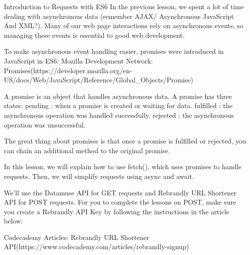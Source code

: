 Introduction to Requests with ES6
    In the previous lesson, we spent a lot of time dealing with asynchronous data (remember AJAX/ Asynchronous JavaScript And XML?). Many of our web page interactions rely on asynchronous events, so managing these events is essential to good web development.

    To make asynchronous event handling easier, promises were introduced in JavaScript in ES6:
        Mozilla Development Network: Promises(https://developer.mozilla.org/en-US/docs/Web/JavaScript/Reference/Global_Objects/Promise)
    
    A promise is an object that handles asynchronous data. A promise has three states:
        pending : when a promise is created or waiting for data.
        fulfilled : the asynchronous operation was handled successfully.
        rejected : the asynchronous operation was unsuccessful.
    
    The great thing about promises is that once a promise is fulfilled or rejected, you can chain an additional method to the original promise.

    In this lesson, we will explain how to use fetch(), which uses promises to handle requests. Then, we will simplify requests using async and await.

    We’ll use the Datamuse API for GET requests and Rebrandly URL Shortener API for POST requests. For you to complete the lessons on POST, make sure you create a Rebrandly API Key by following the instructions in the article below:

    Codecademy Articles:
        Rebrandly URL Shortener API(https://www.codecademy.com/articles/rebrandly-signup)